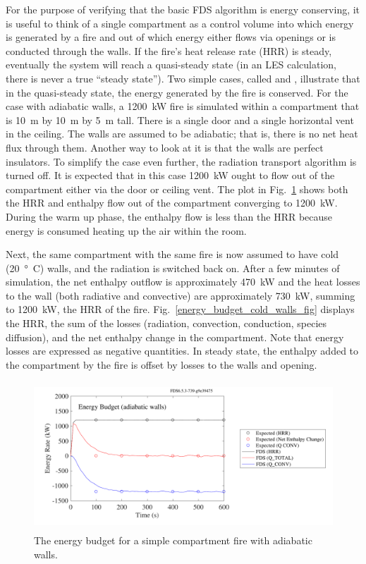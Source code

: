 \documentclass[11pt]{book}
\begin{document}
For the purpose of verifying that the basic FDS algorithm is energy conserving, it is useful to think of a single compartment as a control volume into which energy is generated by a fire and out of which energy either flows via openings or is conducted through the walls. If the fire's heat release rate (HRR) is steady, eventually the system will reach a quasi-steady state (in an LES calculation, there is never a true ``steady state''). Two simple cases, called  and , illustrate that in the quasi-steady state, the energy generated by the fire is conserved. For the case with adiabatic walls, a 1200~kW fire is simulated within a compartment that is 10~m by 10~m by 5~m tall. There is a single door and a single horizontal vent in the ceiling. The walls are assumed to be adiabatic; that is, there is no net heat flux through them. Another way to look at it is that the walls are perfect insulators. To simplify the case even further, the radiation transport algorithm is turned off. It is expected that in this case 1200~kW ought to flow out of the compartment either via the door or ceiling vent. The plot in Fig.~\ref{energy_budget_adiabatic_walls_fig} shows both the HRR and enthalpy flow out of the compartment converging to 1200~kW. During the warm up phase, the enthalpy flow is less than the HRR because energy is consumed heating up the air within the room.

Next, the same compartment with the same fire is now assumed to have cold (20~\si{\degree C}) walls, and the radiation is switched back on. After a few minutes of simulation, the net enthalpy outflow is approximately 470~kW and the heat losses to the wall (both radiative and convective) are approximately 730~kW, summing to 1200~kW, the HRR of the fire. Fig.~\ref{energy_budget_cold_walls_fig} displays the HRR, the sum of the losses (radiation, convection, conduction, species diffusion), and the net enthalpy change in the compartment. Note that energy losses are expressed as negative quantities. In steady state, the enthalpy added to the compartment by the fire is offset by losses to the walls and opening.

\begin{figure}[ht]
\centering
\includegraphics[height=2.2in]{SCRIPT_FIGURES/energy_budget_adiabatic_walls}
\caption[The {\ct energy\_budget\_adiabatic\_walls} test case]{The energy budget for a simple compartment fire with adiabatic walls.}
\label{energy_budget_adiabatic_walls_fig}
\end{figure}
\end{document}

